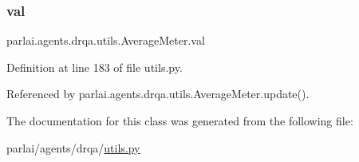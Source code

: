 \subsubsection{\texorpdfstring{val}{val}}
{\footnotesize\ttfamily parlai.\+agents.\+drqa.\+utils.\+Average\+Meter.\+val}



Definition at line 183 of file utils.\+py.



Referenced by parlai.\+agents.\+drqa.\+utils.\+Average\+Meter.\+update().



The documentation for this class was generated from the following file\+:\begin{DoxyCompactItemize}
\item 
parlai/agents/drqa/\hyperlink{parlai_2agents_2drqa_2utils_8py}{utils.\+py}\end{DoxyCompactItemize}
